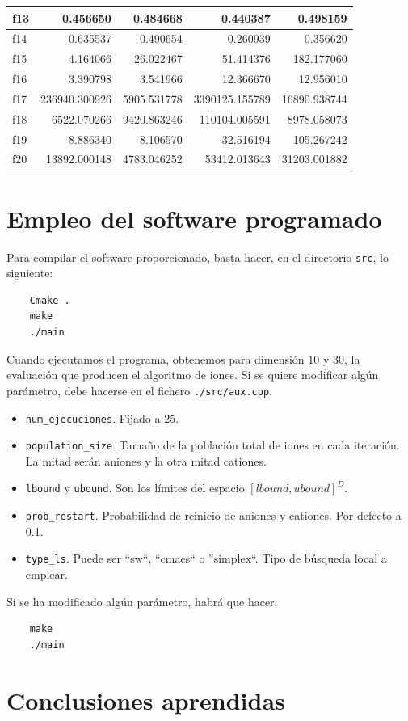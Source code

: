 \documentclass[a4paper,11pt]{article}
\begin{document}
\begin{itemize}
\begin{table}[H]
\begin{tabular}{|l|r|r|||r|r|}
  f13 &  0.456650 &  0.484668 &  0.440387 &  0.498159 \\ \hline
  f14 &  0.635537 &  0.490654 &  0.260939 &  0.356620 \\ \hline
  f15 &  4.164066 &  26.022467 &  51.414376 &  182.177060 \\ \hline
  f16 &  3.390798 &  3.541966 &  12.366670 &  12.956010 \\ \hline
  f17 &  236940.300926 &  5905.531778 &  3390125.155789 &  16890.938744 \\ \hline
  f18 &  6522.070266 &  9420.863246 &  110104.005591 &  8978.058073 \\ \hline
  f19 &  8.886340 &  8.106570 &  32.516194 &  105.267242 \\ \hline
  f20 &  13892.000148 &  4783.046252 &  53412.013643 &  31203.001882 \\ \hline
  \end{tabular}
  \end{table}
 
\end{itemize}



\section{Empleo del software programado}

Para compilar el software proporcionado, basta hacer, en el directorio \texttt{src}, lo siguiente:

\begin{verbatim}
    Cmake .
    make
    ./main
\end{verbatim}

Cuando ejecutamos el programa, obtenemos para dimensión 10 y 30, la evaluación que producen el algoritmo de iones.
Si se quiere modificar algún parámetro, debe hacerse en el fichero \texttt{./src/aux.cpp}. 

\begin{itemize}
 \item \texttt{num\_ejecuciones}. Fijado a 25.
 \item \texttt{population\_size}. Tamaño de la población total de iones en cada iteración. La mitad serán aniones y la otra
 mitad cationes.
 \item \texttt{lbound} y \texttt{ubound}. Son los límites del espacio $[lbound, ubound]^D$.
 \item \texttt{prob\_restart}. Probabilidad de reinicio de aniones y cationes. Por defecto a 0.1.
 \item \texttt{type\_ls}. Puede ser ``sw``, ``cmaes`` o ''simplex``. Tipo de búsqueda local a emplear.
\end{itemize}

Si se ha modificado algún parámetro, habrá que hacer:
\begin{verbatim}
    make
    ./main
\end{verbatim}



\section{Conclusiones aprendidas}
\end{document}

